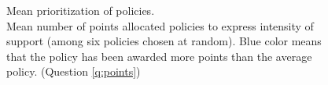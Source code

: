 
\begin{figure}[h!] 
    \caption[Mean prioritization of policies]{Mean prioritization of policies. \\Mean number of points allocated policies to express intensity of support (among six policies chosen at random). Blue color means that the policy has been awarded more points than the average policy. (Question \ref{q:points})}\label{fig:points}
\end{figure}

